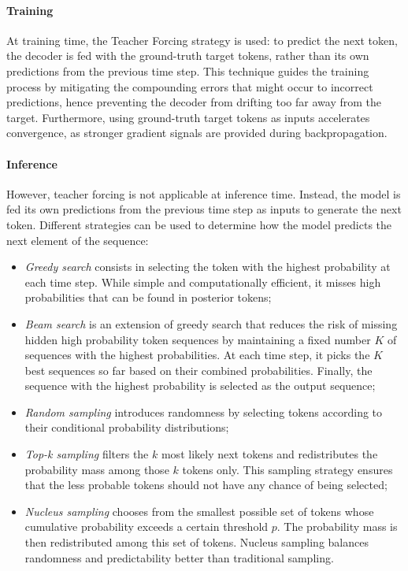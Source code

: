 \paragraph{Training} At training time, the Teacher Forcing strategy is used: to predict the next token, the decoder is fed with the ground-truth target tokens, rather than its own predictions from the previous time step. This technique guides the training process by mitigating the compounding errors that might occur to incorrect predictions, hence preventing the decoder from drifting too far away from the target. Furthermore, using ground-truth target tokens as inputs accelerates convergence, as stronger gradient signals are provided during backpropagation. 

\paragraph{Inference} However, teacher forcing is not applicable at inference time. Instead, the model is fed its own predictions from the previous time step as inputs to generate the next token. Different strategies can be used to determine how the model predicts the next element of the sequence:

\begin{itemize}
    \item \textit{Greedy search} consists in selecting the token with the highest probability at each time step. While simple and computationally efficient, it misses high probabilities that can be found in posterior tokens;
    \item \textit{Beam search} is an extension of greedy search that reduces the risk of missing hidden high probability token sequences by maintaining a fixed number $K$ of sequences with the highest probabilities. At each time step, it picks the $K$ best sequences so far based on their combined probabilities. Finally, the sequence with the highest probability is selected as the output sequence;
    \item \textit{Random sampling} introduces randomness by selecting tokens according to their conditional probability distributions;
    \item \textit{Top-k sampling} \citep{fan2018hierarchical} filters the $k$ most likely next tokens and redistributes the probability mass among those $k$ tokens only. This sampling strategy ensures that the less probable tokens should not have any chance of being selected;
    \item \textit{Nucleus sampling} chooses from the smallest possible set of tokens whose cumulative probability exceeds a certain threshold $p$. The probability mass is then redistributed among this set of tokens. Nucleus sampling balances randomness and predictability better than traditional sampling.
\end{itemize}


